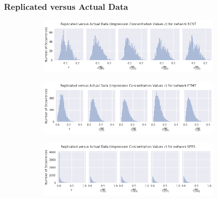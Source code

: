 \documentclass{beamer}
\begin{document}
\begin{frame}
\frametitle{Replicated versus Actual Data}
    \begin{figure}[!h]
      \begin{subfigure}[b]{.75\textwidth}
        \centering
        \includegraphics[scale=0.35]{BCST_c_rep}
      \end{subfigure}
      \begin{subfigure}[b]{.75\textwidth}
        \centering
        \includegraphics[scale=0.35]{ETMT_c_rep}
      \end{subfigure}
      \begin{subfigure}[b]{.75\textwidth}
        \centering
        \includegraphics[scale=0.35]{SPTS_c_rep}
      \end{subfigure}
    \end{figure}
\end{frame}
\end{document}
